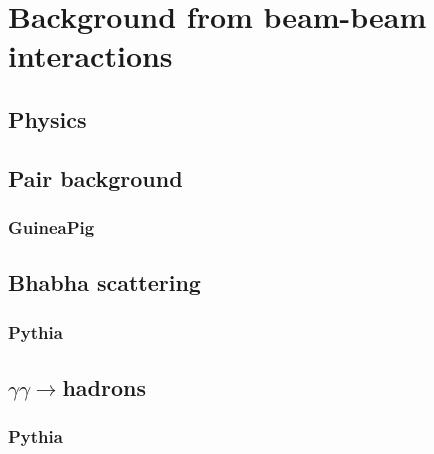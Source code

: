 \chapter{Background from beam-beam interactions}
\label{BeamBeam}
\section{Physics}
\label{BeamBeam:physics}
\section{Pair background}
\label{BeamBeam:pairs}
\subsection{GuineaPig}
\section{Bhabha scattering}
\label{BeamBeam:bhabha}
\subsection{Pythia}
\section{$\gamma\gamma\rightarrow$hadrons}
\label{BeamBeam:gammagamma}
\subsection{Pythia}
